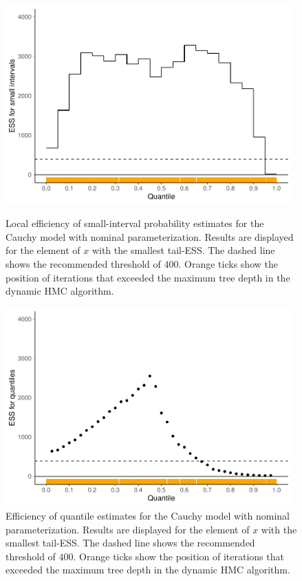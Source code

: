 \documentclass[american,]{article}
\theoremstyle{definition}
\begin{document}
\begin{figure}[tp]
  \centering
  \begin{minipage}{0.48\textwidth}
  \includegraphics[width=0.98\textwidth]{graphics/local-ess-fit-nom-1.pdf}
  \caption{Local efficiency of small-interval probability
    estimates for the Cauchy model with nominal parameterization. 
    Results are displayed for the element of $x$ with the smallest tail-ESS. The dashed line shows the
    recommended threshold of $400$.
    Orange ticks show the position of iterations that exceeded the maximum 
    tree depth in the dynamic HMC algorithm.}
\label{fig:local-ess-fit-nom-1}
\end{minipage}
\hfill
  \begin{minipage}{0.48\textwidth}
  \includegraphics[width=0.98\textwidth]{graphics/quantile-ess-fit-nom-1.pdf}
  \caption{Efficiency of quantile estimates for the Cauchy model with nominal 
  parameterization. Results are displayed for the element of $x$ with the 
  smallest tail-ESS. The dashed line shows the
    recommended threshold of $400$. Orange ticks show the position of iterations that 
  exceeded the maximum tree depth in the dynamic HMC algorithm.\\~}
  \label{fig:quantile-ess-fit-nom-1}
\end{minipage}
\end{figure}
\end{document}
